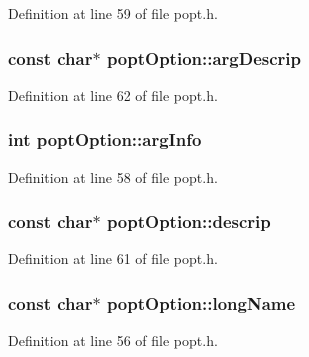 Definition at line 59 of file popt.\+h.

\hypertarget{structpopt_option_aa0eff46a712ca64ea3103be9f73f4373}{}
\subsubsection[{arg\+Descrip}]{\setlength{\rightskip}{0pt plus 5cm}const char$\ast$ popt\+Option\+::arg\+Descrip}\label{structpopt_option_aa0eff46a712ca64ea3103be9f73f4373}


Definition at line 62 of file popt.\+h.

\hypertarget{structpopt_option_a5b1233c5fb30a60d1e8b0c41492ead5f}{}
\subsubsection[{arg\+Info}]{\setlength{\rightskip}{0pt plus 5cm}int popt\+Option\+::arg\+Info}\label{structpopt_option_a5b1233c5fb30a60d1e8b0c41492ead5f}


Definition at line 58 of file popt.\+h.

\hypertarget{structpopt_option_ad0123e0f28a19468eb34e89753064745}{}
\subsubsection[{descrip}]{\setlength{\rightskip}{0pt plus 5cm}const char$\ast$ popt\+Option\+::descrip}\label{structpopt_option_ad0123e0f28a19468eb34e89753064745}


Definition at line 61 of file popt.\+h.

\hypertarget{structpopt_option_acb5681d547739c8417c87aabd7ca7a7f}{}
\subsubsection[{long\+Name}]{\setlength{\rightskip}{0pt plus 5cm}const char$\ast$ popt\+Option\+::long\+Name}\label{structpopt_option_acb5681d547739c8417c87aabd7ca7a7f}


Definition at line 56 of file popt.\+h.

